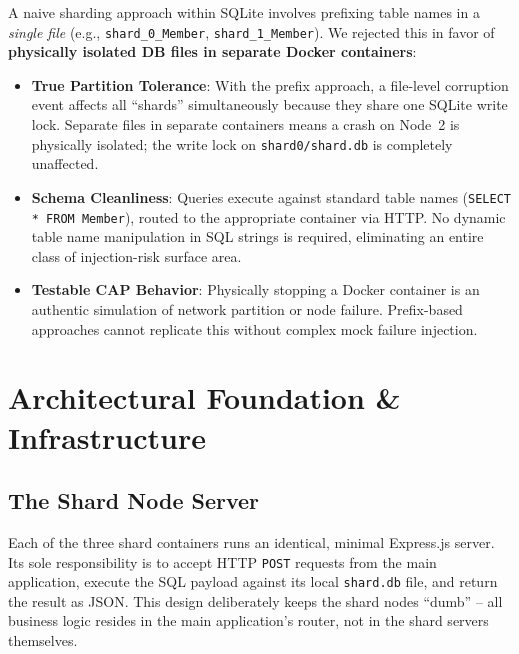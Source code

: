 \documentclass[sigconf]{acmart}
\begin{document}
A naive sharding approach within SQLite involves prefixing table names in a \textit{single file} (e.g., \texttt{shard\_0\_Member}, \texttt{shard\_1\_Member}). We rejected this in favor of \textbf{physically isolated DB files in separate Docker containers}:

\begin{itemize}[leftmargin=*]
    \item \textbf{True Partition Tolerance}: With the prefix approach, a file-level corruption event affects all ``shards'' simultaneously because they share one SQLite write lock. Separate files in separate containers means a crash on Node~2 is physically isolated; the write lock on \texttt{shard0/shard.db} is completely unaffected.
    \item \textbf{Schema Cleanliness}: Queries execute against standard table names (\texttt{SELECT * FROM Member}), routed to the appropriate container via HTTP. No dynamic table name manipulation in SQL strings is required, eliminating an entire class of injection-risk surface area.
    \item \textbf{Testable CAP Behavior}: Physically stopping a Docker container is an authentic simulation of network partition or node failure. Prefix-based approaches cannot replicate this without complex mock failure injection.
\end{itemize}

\section{Architectural Foundation \& Infrastructure}

\subsection{The Shard Node Server}

Each of the three shard containers runs an identical, minimal Express.js server. Its sole responsibility is to accept HTTP \texttt{POST} requests from the main application, execute the SQL payload against its local \texttt{shard.db} file, and return the result as JSON. This design deliberately keeps the shard nodes ``dumb'' -- all business logic resides in the main application's router, not in the shard servers themselves.
\end{document}
